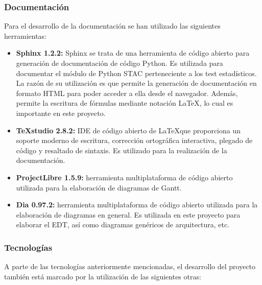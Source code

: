 \subsubsection{\textbf{Documentación}}
Para el desarrollo de la documentación se han utilizado las siguientes herramientas:
\begin{itemize}
\item \textbf{Sphinx 1.2.2:} Sphinx se trata de una herramienta de código abierto para generación de documentación de código Python. Es utilizada para documentar el módulo de Python STAC perteneciente a los test estadísticos. La razón de su utilización es que permite la generación de documentación en formato HTML para poder acceder a ella desde el navegador. Además, permite la escritura de fórmulas mediante notación \LaTeX, lo cual es importante en este proyecto.
\item \textbf{TeXstudio 2.8.2:} IDE de código abierto de \LaTeX \space que proporciona un soporte moderno de escritura, corrección ortográfica interactiva, plegado de código y resaltado de sintaxis. Es utilizado para la realización de la documentación.
\item \textbf{ProjectLibre 1.5.9:} herramienta multiplataforma de código abierto utilizada para la elaboración de diagramas de Gantt.
\item \textbf{Dia 0.97.2:} herramienta multiplataforma de código abierto utilizada para la elaboración de diagramas en general. Es utilizada en este proyecto para elaborar el EDT, así como diagramas genéricos de arquitectura, etc.
\end{itemize}

\subsubsection{\textbf{Tecnologías}}
A parte de las tecnologías anteriormente mencionadas, el desarrollo del proyecto también está marcado por la utilización de las siguientes otras:

